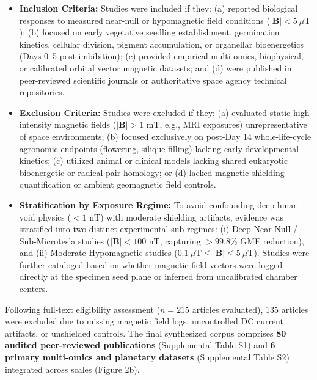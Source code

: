 \documentclass[default,sn-nature,iicol]{sn-jnl}
\begin{document}
\begin{itemize}
\item \textbf{Inclusion Criteria:} Studies were included if they: (a) reported biological responses to measured near-null or hypomagnetic field conditions ($|\mathbf{B}| < 5\ \mu\text{T}$); (b) focused on early vegetative seedling establishment, germination kinetics, cellular division, pigment accumulation, or organellar bioenergetics (Days 0--5 post-imbibition); (c) provided empirical multi-omics, biophysical, or calibrated orbital vector magnetic datasets; and (d) were published in peer-reviewed scientific journals or authoritative space agency technical repositories.
\item \textbf{Exclusion Criteria:} Studies were excluded if they: (a) evaluated static high-intensity magnetic fields ($|\mathbf{B}| > 1\text{ mT}$, e.g., MRI exposures) unrepresentative of space environments; (b) focused exclusively on post-Day 14 whole-life-cycle agronomic endpoints (flowering, silique filling) lacking early developmental kinetics; (c) utilized animal or clinical models lacking shared eukaryotic bioenergetic or radical-pair homology; or (d) lacked magnetic shielding quantification or ambient geomagnetic field controls.
\item \textbf{Stratification by Exposure Regime:} To avoid confounding deep lunar void physics ($<1\text{ nT}$) with moderate shielding artifacts, evidence was stratified into two distinct experimental sub-regimes: (i) Deep Near-Null / Sub-Microtesla studies ($|\mathbf{B}| < 100\text{ nT}$, capturing $>99.8\%$ GMF reduction), and (ii) Moderate Hypomagnetic studies ($0.1\ \mu\text{T} \le |\mathbf{B}| \le 5\ \mu\text{T}$). Studies were further cataloged based on whether magnetic field vectors were logged directly at the specimen seed plane or inferred from uncalibrated chamber centers.
\end{itemize}

Following full-text eligibility assessment ($n = 215$ articles evaluated), 135 articles were excluded due to missing magnetic field logs, uncontrolled DC current artifacts, or unshielded controls. The final synthesized corpus comprises \textbf{80 audited peer-reviewed publications} (Supplemental Table S1) and \textbf{6 primary multi-omics and planetary datasets} (Supplemental Table S2) integrated across scales (Figure 2b).
\end{document}
